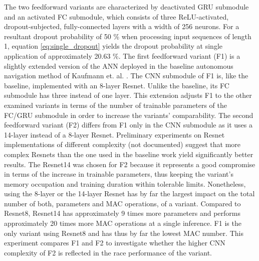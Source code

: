 The two feedforward variants 
are characterized by 
deactivated GRU submodule and an activated FC submodule,
which consists of three
ReLU-activated, dropout-subjected, fully-connected layers
with a width of 256 neurons.
For a resultant dropout probability of 50 \%
when processing input sequences of length 1,
equation \ref{eq:single_dropout} yields the dropout probability 
at single application of approximately 20.63 \%.
The first feedforward variant (F1)
is a slightly extended version of the ANN 
deployed in the baseline autonomous navigation method 
of Kaufmann et. al. \cite{Kaufmann2018}.
The CNN submodule of F1 is,
like the baseline, 
implemented with an 8-layer Resnet.
Unlike the baseline, its FC submodule 
has three instead of one layer.
This extension adjusts F1
to the other examined variants in terms of
the number of trainable parameters of the FC/GRU submodule
in order to increase the variants' comparability.
The second feedforward variant (F2) differs from F1
only in the CNN submodule
as it uses a 14-layer instead of a 8-layer Resnet.
Preliminary experiments on Resnet
implementations of different complexity
(not documented)
suggest that more complex Resnets 
than the one used in the baseline work
yield significantly better results.
The Resnet14 was chosen for F2
because it represents a good compromise
in terms of the increase in trainable parameters,
thus keeping the variant's
memory occupation 
and training duration within tolerable limits.
Nonetheless, using the 8-layer or the 14-layer Resnet
has by far the largest impact on the 
total number of both, parameters and MAC operations, of a variant.
Compared to Resnet8, 
Resnet14 has approximately 
9 times more parameters and 
performs approximately 20 times more MAC operations
at a single inference.
F1 is the only variant using Resnet8
and has thus by far the lowest MAC number.
This experiment compares F1 and F2 
to investigate whether the higher CNN complexity of F2 
is reflected in the race performance of the variant.


